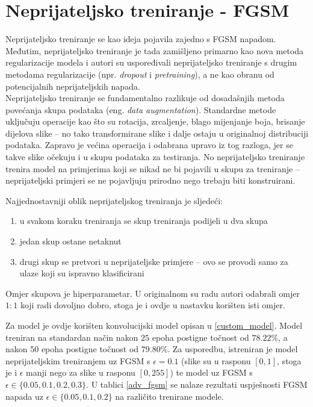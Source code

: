 \documentclass[utf8, diplomski]{fer}
\begin{document}
\section{Neprijateljsko treniranje - FGSM}
Neprijateljsko treniranje se kao ideja pojavila zajedno s FGSM napadom\citep{Goodfellow2015ExplainingAH}. Međutim, neprijateljsko treniranje je tada zamišljeno primarno kao nova metoda regularizacije modela i autori su uspoređivali neprijateljsko treniranje s drugim metodama regularizacije (npr. \textit{dropout} i \textit{pretraining}), a ne kao obranu od potencijalnih neprijateljskih napada. \\
Neprijateljsko treniranje se fundamentalno razlikuje od dosadašnjih metoda povećanja skupa podataka (eng. \textit{data augmentation}). Standardne metode uključuju operacije kao što su rotacija, zrcaljenje, blago mijenjanje boja, brisanje dijelova slike -- no tako transformirane slike i dalje ostaju u originalnoj distribuciji podataka. Zapravo je većina operacija i odabrana upravo iz tog razloga, jer se takve slike očekuju i u skupu podataka za testiranja. No neprijateljsko treniranje trenira model na primjerima koji se nikad ne bi pojavili u skupu za treniranje -- neprijateljski primjeri se ne pojavljuju prirodno nego trebaju biti konstruirani. \par
Najjednostavniji oblik neprijateljskog treniranja je sljedeći:
\begin{enumerate}[noitemsep, label=\textbullet]
  \item u svakom koraku treniranja se skup treniranja podijeli u dva skupa
  \item jedan skup ostane netaknut
  \item drugi skup se pretvori u neprijateljske primjere -- ovo se provodi samo za ulaze koji su ispravno klasificirani
\end{enumerate} 
Omjer skupova je hiperparametar. U originalnom su radu autori odabrali omjer $1:1$ koji radi dovoljno dobro, stoga je i ovdje u nastavku korišten isti omjer.
\par
Za model je ovdje korišten konvolucijski model opisan u \ref{custom_model}. Model treniran na standardan način nakon $25$ epoha postigne točnost od $78.22\%$, a nakon 50 epoha postigne točnost od $79.80\%$. Za usporedbu, istreniran je model neprijateljskim treniranjem uz FGSM s $\epsilon = 0.1$ (slike su u rasponu $[0, 1]$, stoga je i $\epsilon$ manji nego za slike u rasponu $[0, 255]$) te model uz FGSM s $\epsilon \in \{0.05, 0.1, 0.2, 0.3\}$. U tablici \ref{adv_fgsm} se nalaze rezultati uspješnosti FGSM napada uz $\epsilon \in \{0.05, 0.1, 0.2\}$ na različito trenirane modele.
\end{document}
